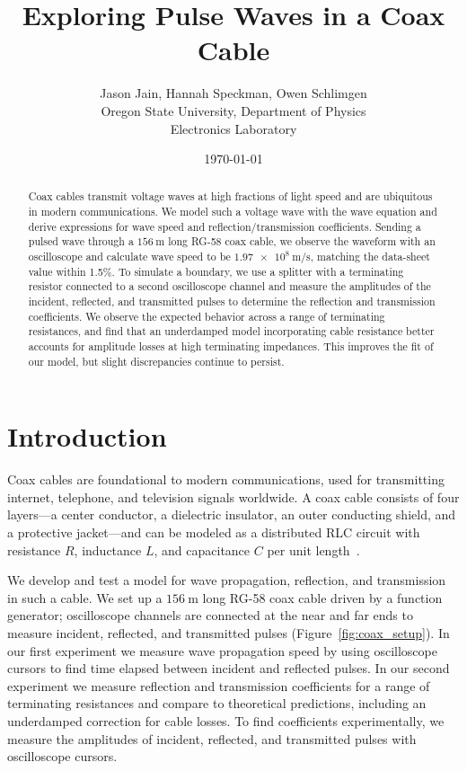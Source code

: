 \documentclass[11pt]{article}
\title{Exploring Pulse Waves in a Coax Cable}
\author{Jason Jain, Hannah Speckman, Owen Schlimgen \\
        Oregon State University, Department of Physics \\
        Electronics Laboratory}
\date{\today}
\begin{document}
\maketitle

\begin{abstract}
  Coax cables transmit voltage waves at high fractions of light speed and are ubiquitous in modern communications. We model such a voltage wave with the wave equation and derive expressions for wave speed and reflection/transmission coefficients.  Sending a pulsed wave through a $\qty{156}{\meter}$ long RG-58 coax cable, we observe the waveform with an oscilloscope and calculate wave speed to be $\qty{1.97e8}{\meter / \s}$, matching the data-sheet value within 1.5\%. To simulate a boundary, we use a splitter with a terminating resistor connected to a second oscilloscope channel and measure the amplitudes of the incident, reflected, and transmitted pulses to determine the reflection and transmission coefficients. We observe the expected behavior across a range of terminating resistances, and find that an underdamped model incorporating cable resistance better accounts for amplitude losses at high terminating impedances. This improves the fit of our model, but slight discrepancies continue to persist.
\end{abstract}

\section{Introduction}\label{sec:introduction}

Coax cables are foundational to modern communications, used for transmitting internet, telephone, and television signals worldwide. A coax cable consists of four layers---a center conductor, a dielectric insulator, an outer conducting shield, and a protective jacket---and can be modeled as a distributed RLC circuit with resistance $R$, inductance $L$, and capacitance $C$ per unit length~\cite{gfgcoax}.

We develop and test a model for wave propagation, reflection, and transmission in such a cable. We set up a $\qty{156}{\meter}$ long RG-58 coax cable driven by a function generator; oscilloscope channels are connected at the near and far ends to measure incident, reflected, and transmitted pulses (Figure~\ref{fig:coax_setup}). In our first experiment we measure wave propagation speed by using oscilloscope cursors to find time elapsed between incident and reflected pulses. In our second experiment we measure reflection and transmission coefficients for a range of terminating resistances and compare to theoretical predictions, including an underdamped correction for cable losses. To find coefficients experimentally, we measure the amplitudes of incident, reflected, and transmitted pulses with oscilloscope cursors. 
\end{document}
